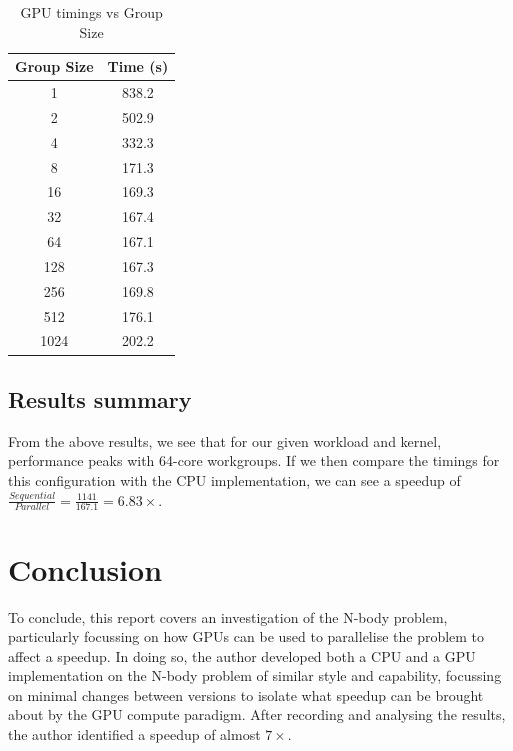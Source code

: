 \documentclass[journal,transmag]{IEEEtran}
\begin{document}
        \begin{table}[h]
            \centering
            \caption{GPU timings vs Group Size}
            \label{GPUvsGroupsSizeTable}
            \begin{tabular}{ c c }
                Group Size & Time (s) \\
                \hline
                \hline
                   1       & 838.2 \\
                   2       & 502.9 \\
                   4       & 332.3 \\
                   8       & 171.3 \\
                  16       & 169.3 \\
                  32       & 167.4 \\
                \hline
                  64       & 167.1 \\
                \hline
                 128       & 167.3 \\
                 256       & 169.8 \\
                 512       & 176.1 \\
                1024       & 202.2 \\
            \end{tabular}
        \end{table}

        \subsection{Results summary}
        From the above results, we see that for our given workload and kernel, performance peaks with 64-core
        workgroups. If we then compare the timings for this configuration with the CPU implementation, we can see a
        speedup of $ \frac{Sequential}{Parallel} = \frac{1141}{167.1} = 6.83\times $.

    \section{Conclusion}
    To conclude, this report covers an investigation of the N-body problem, particularly focussing on how GPUs can be
    used to parallelise the problem to affect a speedup. In doing so, the author developed both a CPU and a GPU
    implementation on the N-body problem of similar style and capability, focussing on minimal changes between versions
    to isolate what speedup can be brought about by the GPU compute paradigm. After recording and analysing the results,
    the author identified a speedup of almost $ 7\times $.
\end{document}
